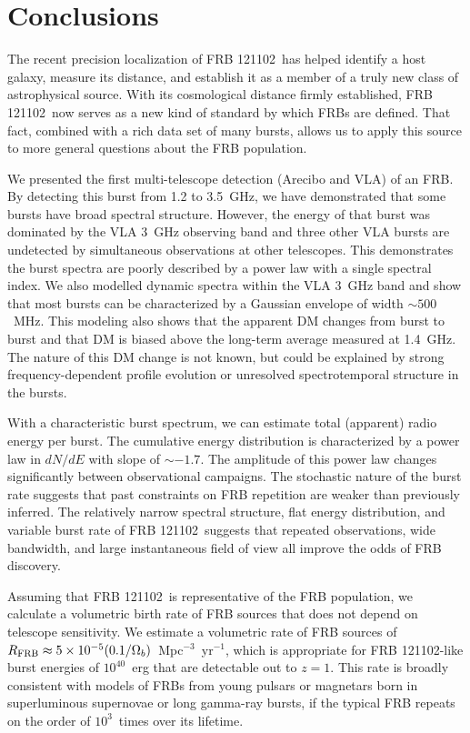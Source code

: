 \documentclass[twocolumn]{aastex61}
\newcommand{\frb}{FRB 121102}
\begin{document}
\section{Conclusions}

The recent precision localization of \frb\ has helped identify a host galaxy, measure its distance, and establish it as a member of a truly new class of astrophysical source. With its cosmological distance firmly established, \frb\ now serves as a new kind of standard by which FRBs are defined. That fact, combined with a rich data set of many bursts, allows us to apply this source to more general questions about the FRB population.

We presented the first multi-telescope detection (Arecibo and VLA) of an FRB. By detecting this burst from 1.2 to 3.5~GHz, we have demonstrated that some bursts have broad spectral structure. However, the energy of that burst was dominated by the VLA 3~GHz observing band and three other VLA bursts are undetected by simultaneous observations at other telescopes. This demonstrates the burst spectra are poorly described by a power law with a single spectral index. We also modelled dynamic spectra within the VLA 3~GHz band and show that most bursts can be characterized by a Gaussian envelope of width $\sim500$\ MHz. This modeling also shows that the apparent DM changes from burst to burst and that DM is biased above the long-term average measured at 1.4~GHz. The nature of this DM change is not known, but could be explained by strong frequency-dependent profile evolution or unresolved spectrotemporal structure in the bursts.

With a characteristic burst spectrum, we can estimate total (apparent) radio energy per burst. The cumulative energy distribution is characterized by a power law in $dN/dE$ with slope of $\sim-1.7$. The amplitude of this power law changes significantly between observational campaigns. The stochastic nature of the burst rate suggests that past constraints on FRB repetition are weaker than previously inferred. The relatively narrow spectral structure, flat energy distribution, and variable burst rate of \frb\ suggests that repeated observations, wide bandwidth, and large instantaneous field of view all improve the odds of FRB discovery.

Assuming that \frb\ is representative of the FRB population, we calculate a volumetric birth rate of FRB sources that does not depend on telescope sensitivity. We estimate a volumetric rate of FRB sources of $R_{\rm{FRB}} \approx 5\times10^{-5} (0.1/\Omega_b)$\ Mpc$^{-3}$\ yr$^{-1}$, which is appropriate for \frb-like burst energies of $10^{40}$\ erg that are detectable out to $z=1$. This rate is broadly consistent with models of FRBs from young pulsars or magnetars born in superluminous supernovae or long gamma-ray bursts, if the typical FRB repeats on the order of $10^3$\ times over its lifetime.
\end{document}
